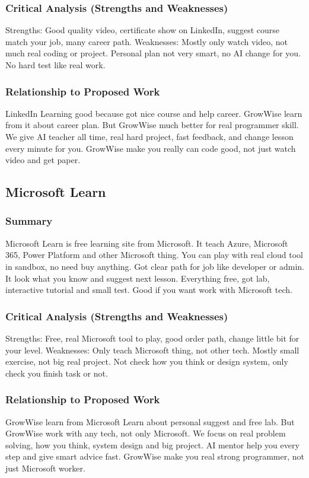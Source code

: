 \documentclass{FastFyp}
\begin{document}
\subsubsection{Critical Analysis (Strengths and Weaknesses)}
Strengths: Good quality video, certificate show on LinkedIn, suggest course match your job, many career path.  
Weaknesses: Mostly only watch video, not much real coding or project. Personal plan not very smart, no AI change for you. No hard test like real work.

\subsubsection{Relationship to Proposed Work}
LinkedIn Learning good because got nice course and help career. GrowWise learn from it about career plan. But GrowWise much better for real programmer skill. We give AI teacher all time, real hard project, fast feedback, and change lesson every minute for you. GrowWise make you really can code good, not just watch video and get paper.

\subsection{Microsoft Learn}

\subsubsection{Summary}
Microsoft Learn \cite{ref:MicrosoftLearn} is free learning site from Microsoft. It teach Azure, Microsoft 365, Power Platform and other Microsoft thing. You can play with real cloud tool in sandbox, no need buy anything. Got clear path for job like developer or admin. It look what you know and suggest next lesson. Everything free, got lab, interactive tutorial and small test. Good if you want work with Microsoft tech.

\subsubsection{Critical Analysis (Strengths and Weaknesses)}
Strengths: Free, real Microsoft tool to play, good order path, change little bit for your level.  
Weaknesses: Only teach Microsoft thing, not other tech. Mostly small exercise, not big real project. Not check how you think or design system, only check you finish task or not.

\subsubsection{Relationship to Proposed Work}
GrowWise learn from Microsoft Learn about personal suggest and free lab. But GrowWise work with any tech, not only Microsoft. We focus on real problem solving, how you think, system design and big project. AI mentor help you every step and give smart advice fast. GrowWise make you real strong programmer, not just Microsoft worker.
\end{document}
